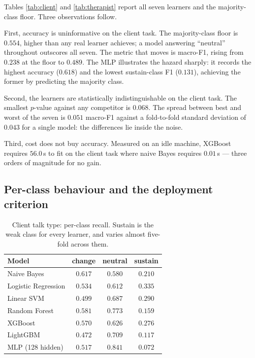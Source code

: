 \documentclass[conference]{IEEEtran}
\begin{document}
Tables \ref{tab:client} and \ref{tab:therapist} report all seven learners and
the majority-class floor. Three observations follow.

First, accuracy is uninformative on the client task. The majority-class floor
is $0.554$, higher than any real learner achieves; a model answering
``neutral'' throughout outscores all seven. The metric that moves is macro-F1,
rising from $0.238$ at the floor to $0.489$. The MLP illustrates the hazard
sharply: it records the highest accuracy ($0.618$) and the lowest sustain-class
F1 ($0.131$), achieving the former by predicting the majority class.

Second, the learners are statistically indistinguishable on the client task.
The smallest $p$-value against any competitor is $0.068$. The spread between
best and worst of the seven is $0.051$ macro-F1 against a fold-to-fold
standard deviation of $0.043$ for a single model: the differences lie inside
the noise.

Third, cost does not buy accuracy. Measured on an idle machine, XGBoost
requires $56.0$\,s to fit on the client task where naive Bayes requires
$0.01$\,s --- three orders of magnitude for no gain.

\subsection{Per-class behaviour and the deployment criterion}

\begin{table}[t]
\caption{Client talk type: per-class recall. Sustain is the weak class for
every learner, and varies almost five-fold across them.}
\label{tab:recall}
\centering
\footnotesize
\begin{tabular}{lccc}
\toprule
Model & change & neutral & sustain \\
\midrule
Naive Bayes          & $0.617$ & $0.580$ & $0.210$ \\
Logistic Regression  & $0.534$ & $0.612$ & $\mathbf{0.335}$ \\
Linear SVM           & $0.499$ & $0.687$ & $0.290$ \\
Random Forest        & $0.581$ & $0.773$ & $0.159$ \\
XGBoost              & $0.570$ & $0.626$ & $0.276$ \\
LightGBM             & $0.472$ & $0.709$ & $0.117$ \\
MLP (128 hidden)     & $0.517$ & $\mathbf{0.841}$ & $0.072$ \\
\bottomrule
\end{tabular}
\end{table}
\end{document}
